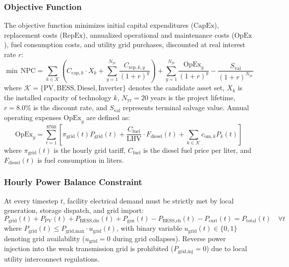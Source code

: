 \documentclass[12pt,3p,review]{elsarticle}
\begin{document}
\subsubsection{Objective Function}
The objective function minimizes initial capital expenditures ($\text{CapEx}$), replacement costs ($\text{RepEx}$), annualized operational and maintenance costs ($\text{OpEx}$), fuel consumption costs, and utility grid purchases, discounted at real interest rate $r$:
\begin{equation}
    \min \, \text{NPC} = \sum_{k \in \mathcal{K}} \left( C_{\text{cap},k} \cdot X_k + \sum_{y=1}^{N_{\text{yr}}} \frac{C_{\text{rep},k,y}}{(1+r)^y} \right) + \sum_{y=1}^{N_{\text{yr}}} \frac{\text{OpEx}_y}{(1+r)^y} - \frac{S_{\text{val}}}{(1+r)^{N_{\text{yr}}}}
    \label{eq:objective}
\end{equation}
where $\mathcal{K} = \{\text{PV}, \text{BESS}, \text{Diesel}, \text{Inverter}\}$ denotes the candidate asset set, $X_k$ is the installed capacity of technology $k$, $N_{\text{yr}} = 20$ years is the project lifetime, $r = 8.0\%$ is the discount rate, and $S_{\text{val}}$ represents terminal salvage value. Annual operating expenses $\text{OpEx}_y$ are defined as:
\begin{equation}
    \text{OpEx}_y = \sum_{t=1}^{8760} \left[ \pi_{\text{grid}}(t) P_{\text{grid}}(t) + \frac{C_{\text{fuel}}}{\text{LHV}} \cdot F_{\text{diesel}}(t) + \sum_{k \in \mathcal{K}} c_{\text{om},k} P_k(t) \right]
\end{equation}
where $\pi_{\text{grid}}(t)$ is the hourly grid tariff, $C_{\text{fuel}}$ is the diesel fuel price per liter, and $F_{\text{diesel}}(t)$ is fuel consumption in liters.

\subsubsection{Hourly Power Balance Constraint}
At every timestep $t$, facility electrical demand must be strictly met by local generation, storage dispatch, and grid import:
\begin{equation}
    P_{\text{grid}}(t) + P_{\text{PV}}(t) + P_{\text{BESS,dis}}(t) + P_{\text{gen}}(t) - P_{\text{BESS,ch}}(t) - P_{\text{curt}}(t) = P_{\text{total}}(t) \quad \forall t
    \label{eq:balance}
\end{equation}
where $P_{\text{grid}}(t) \le P_{\text{grid,max}} \cdot u_{\text{grid}}(t)$, with binary variable $u_{\text{grid}}(t) \in \{0, 1\}$ denoting grid availability ($u_{\text{grid}}=0$ during grid collapses). Reverse power injection into the weak transmission grid is prohibited ($P_{\text{grid,inj}} = 0$) due to local utility interconnect regulations.
\end{document}
